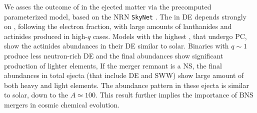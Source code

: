 We asses the outcome of \rproc{} \nuc{} in the ejected matter via the precomputed 
parameterized model, based on the \ac{NRN} \texttt{SkyNet} \citep{Lippuner:2015gwa}.
%
The \rproc{} in \ac{DE} depends strongly on \mr{}, following the electron fraction,
with large amounts of lanthanides and actinides produced in high-$q$ cases.
Models with the highest \mr{}, that undergo \ac{PC}, show the 
actinides abundances in their \ac{DE} similar to solar.
%
Binaries with $q \sim 1$ produce less neutron-rich \ac{DE} and the 
final abundances show significant production of lighter elements,
If the merger remnant is a \ac{NS}, the final \rproc{} abundances in total ejecta 
(that include \ac{DE} and \ac{SWW}) show large amount 
of both heavy and light elements. 
The abundance pattern in these ejecta is similar to solar, down to the $A\simeq 100$.
This result further implies the importance of \ac{BNS} mergers in cosmic 
chemical evolution.

